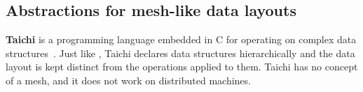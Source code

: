 \documentclass[thesis]{subfiles}
\begin{document}


\subsection{Abstractions for mesh-like data layouts}






\textbf{Taichi} is a programming language embedded in C\+\+ for operating on complex data structures~\cite{huTaichiLanguageHighperformance2019}.
Just like , Taichi declares data structures hierarchically and the data layout is kept distinct from the operations applied to them.
Taichi has no concept of a mesh, and it does not work on distributed machines.
\end{document}
